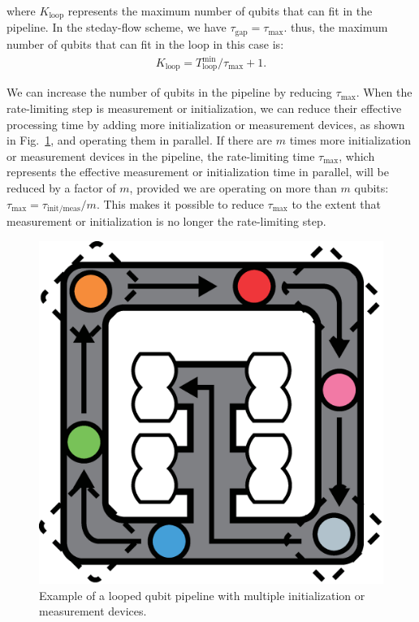 \documentclass[a4paper,11pt]{ltjsarticle}
\begin{document}
{{        where $K_\text{loop}$ represents the maximum number of qubits that can fit in the pipeline. In the steday-flow scheme, we have $\tau_\text{gap} = \tau_\text{max}$. thus, the maximum number of qubits that can fit in the loop in this case is:
        \begin{align}
            K_\text{loop} = T_\text{loop}^\text{min}/\tau_\text{max} + 1.
        \end{align}

        We can increase the number of qubits in the pipeline by reducing $\tau_\text{max}$. When the rate-limiting step is measurement or initialization, we can reduce their effective processing time by adding more initialization or measurement devices, as shown in Fig.~\ref{more_devices}, and operating them in parallel. If there are $m$ times more initialization or measurement devices in the pipeline, the rate-limiting time $\tau_\text{max}$, which represents the effective measurement or initialization time in parallel, will be reduced by a factor of $m$, provided we are operating on more than $m$ qubits: $\tau_\text{max} = \tau_\text{init/meas}/m$. This makes it possible to reduce $\tau_\text{max}$ to the extent that measurement or initialization is no longer the rate-limiting step.

        \begin{figure}[h]
            \centering
            \includegraphics[scale=0.15]{figure/more_devices.eps}
            \vspace{0pt}\caption{Example of a looped qubit pipeline with multiple
            initialization or measurement devices.}
            \label{more_devices}
        \end{figure}
    }
}
\end{document}
